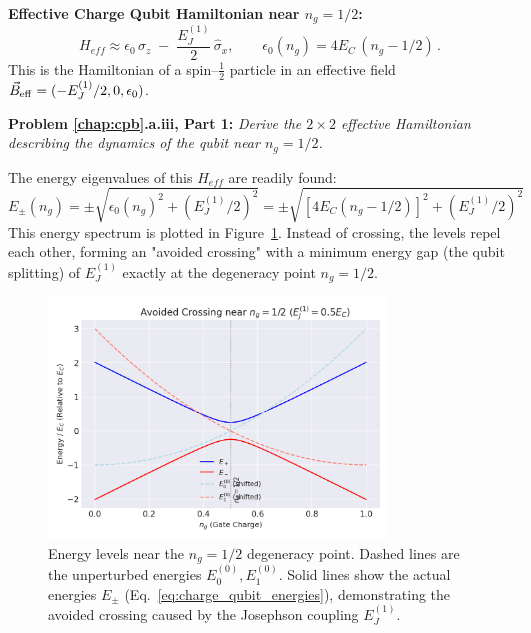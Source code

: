 \documentclass{book}
\newenvironment{keyresult}[1][Key Result]{\begin{framed}\noindent\textbf{#1:}}{\end{framed}}
\newenvironment{problem}[1][Problem]{\par\medskip\noindent\textbf{#1:}\em}{\par\medskip}
\begin{document}
\begin{keyresult}[Effective Charge Qubit Hamiltonian near $n_g = 1/2$]
\label{res:charge_qubit_ham}
\[
H_{eff} \approx \epsilon_0 \,\hat{\sigma}_z
              \;-\;\frac{E_J^{(1)}}{2}\,\hat{\sigma}_x,
\qquad
\epsilon_0(n_g) = 4E_C\,(n_g - 1/2)\,. 
\]
This is the Hamiltonian of a spin–\(\tfrac12\) particle in an effective field 
\(\vec B_{\rm eff}=(-E_J^{(1)}/2,0,\epsilon_0)\).

\end{keyresult}

\begin{problem}[Problem \ref{chap:cpb}.a.iii, Part 1]
Derive the \(2 \times 2\) effective Hamiltonian describing the dynamics of the qubit near \(n_g=1/2\).
\end{problem}

The energy eigenvalues of this \(H_{eff}\) are readily found:
\begin{equation}
E_{\pm}(n_g) = \pm \sqrt{\epsilon_0(n_g)^2 + (E_J^{(1)}/2)^2} = \pm \sqrt{[4 E_C (n_g - 1/2)]^2 + (E_J^{(1)}/2)^2}
\label{eq:charge_qubit_energies}
\end{equation}
This energy spectrum is plotted in Figure~\ref{fig:avoided_crossing}. Instead of crossing, the levels repel each other, forming an "avoided crossing" with a minimum energy gap (the qubit splitting) of \(E_J^{(1)}\) exactly at the degeneracy point \(n_g=1/2\).

\begin{figure}[ht]
    \centering
    \includegraphics[width=0.8\textwidth]{fig_avoid_crossing.png}
    \caption[Avoided crossing near n\_g=1/2]{Energy levels near the \(n_g = 1/2\) degeneracy point. Dashed lines are the unperturbed energies \(E_0^{(0)}, E_1^{(0)}\). Solid lines show the actual energies \(E_{\pm}\) (Eq.~\ref{eq:charge_qubit_energies}), demonstrating the avoided crossing caused by the Josephson coupling \(E_J^{(1)}\).}
    \label{fig:avoided_crossing}
\end{figure}
\end{document}
